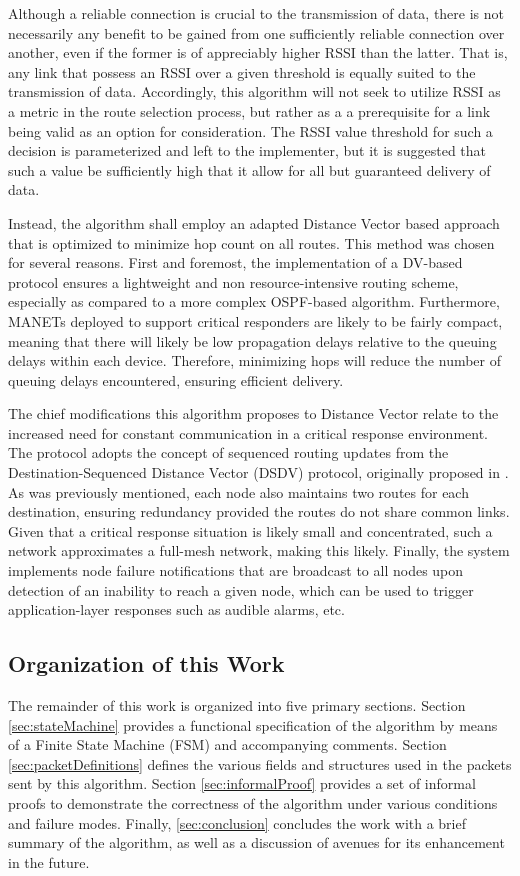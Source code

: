 Although a reliable connection is crucial to the transmission of data, there is not necessarily any benefit to be gained from one sufficiently reliable connection over another, even if the former is of appreciably higher RSSI than the latter. That is, any link that possess an RSSI over a given threshold is equally suited to the transmission of data. Accordingly, this algorithm will not seek to utilize RSSI as a metric in the route selection process, but rather as a a prerequisite for a link being valid as an option for consideration. The RSSI value threshold for such a decision is parameterized and left to the implementer, but it is suggested that such a value be sufficiently high that it allow for all but guaranteed delivery of data.

Instead, the algorithm shall employ an adapted Distance Vector based approach that is optimized to minimize hop count on all routes. This method was chosen for several reasons. First and foremost, the implementation of a DV-based protocol ensures a lightweight and non resource-intensive routing scheme, especially as compared to a more complex OSPF-based algorithm. Furthermore, MANETs deployed to support critical responders are likely to be fairly compact, meaning that there will likely be low propagation delays relative to the queuing delays within each device. Therefore, minimizing hops will reduce the number of queuing delays encountered, ensuring efficient delivery.

The chief modifications this algorithm proposes to Distance Vector relate to the increased need for constant communication in a critical response environment. The protocol adopts the concept of sequenced routing updates from the Destination-Sequenced Distance Vector (DSDV) protocol, originally proposed in \cite{perkins_highly_1994}. As was previously mentioned, each node also maintains two routes for each destination, ensuring redundancy provided the routes do not share common links. Given that a critical response situation is likely small and concentrated, such a network approximates a full-mesh network, making this likely. Finally, the system implements node failure notifications that are broadcast to all nodes upon detection of an inability to reach a given node, which can be used to trigger application-layer responses such as audible alarms, etc.

\subsection{Organization of this Work}\label{subsec:IntroOrganization}
The remainder of this work is organized into five primary sections. Section \ref{sec:stateMachine} provides a functional specification of the algorithm by means of a Finite State Machine (FSM) and accompanying comments. Section \ref{sec:packetDefinitions} defines the various fields and structures used in the packets sent by this algorithm. Section \ref{sec:informalProof} provides a set of informal proofs to demonstrate the correctness of the algorithm under various conditions and failure modes. Finally, \ref{sec:conclusion} concludes the work with a brief summary of the algorithm, as well as a discussion of avenues for its enhancement in the future.